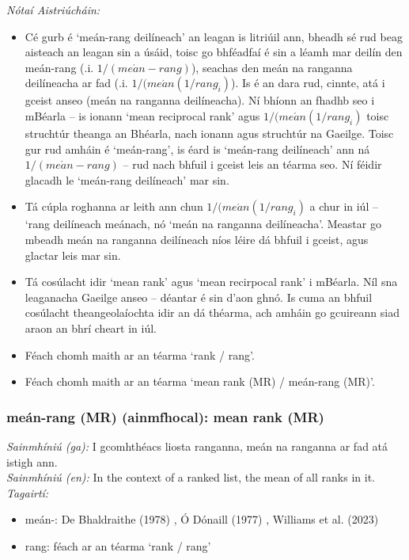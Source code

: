  \noindent \textit{Nótaí Aistriúcháin:}
\begin{itemize}
	\item Cé gurb é `meán-rang deilíneach' an leagan is litriúil ann, bheadh sé rud beag aisteach an leagan sin a úsáid, toisc go bhféadfaí é sin a léamh mar deilín den meán-rang (.i. $1 / (me\acute{a}n-rang)$), seachas den meán na ranganna deilíneacha ar fad (.i. $1 / (me\acute{a}n(1 / rang_i)$). Is é an dara rud, cinnte, atá i gceist anseo (meán na ranganna deilíneacha). Ní bhíonn an fhadhb seo i mBéarla -- is ionann `mean reciprocal rank' agus $1 / (me\acute{a}n(1 / rang_i)$ toisc struchtúr theanga an Bhéarla, nach ionann agus struchtúr na Gaeilge. Toisc gur rud amháin é `meán-rang', is éard is `meán-rang deilíneach' ann ná $1 / (me\acute{a}n-rang)$ -- rud nach bhfuil i gceist leis an téarma seo. Ní féidir glacadh le `meán-rang deilíneach' mar sin.
	\item Tá cúpla roghanna ar leith ann chun $1 / (me\acute{a}n(1 / rang_i)$ a chur in iúl -- `rang deilíneach meánach, nó `meán na ranganna deilíneacha'. Meastar go mbeadh meán na ranganna deilíneach níos léire dá bhfuil i gceist, agus glactar leis mar sin.
	\item Tá cosúlacht idir `mean rank' agus `mean recirpocal rank' i mBéarla. Níl sna leaganacha Gaeilge anseo -- déantar é sin d'aon ghnó. Is cuma an bhfuil cosúlacht theangeolaíochta idir an dá théarma, ach amháin go gcuireann siad araon an bhrí cheart in iúl.
	\item Féach chomh maith ar an téarma `rank / rang'.
	\item Féach chomh maith ar an téarma `mean rank (MR) / meán-rang (MR)'.
\end{itemize}


\subsubsection*{meán-rang (MR) (ainmfhocal): mean rank (MR)}
 \noindent \textit{Sainmhíniú (ga):} I gcomhthéacs liosta ranganna, meán na ranganna ar fad atá istigh ann.
\\
 \noindent \textit{Sainmhíniú (en):} In the context of a ranked list, the mean of all ranks in it.
\\
 \noindent \textit{Tagairtí:}
\begin{itemize}
	\item meán-: De Bhaldraithe (1978) \cite{de-bhaldraithe}, Ó Dónaill (1977) \cite{odonaill}, Williams et al. (2023) \cite{storchiste}
	\item rang: féach ar an téarma `rank / rang'
\end{itemize}

